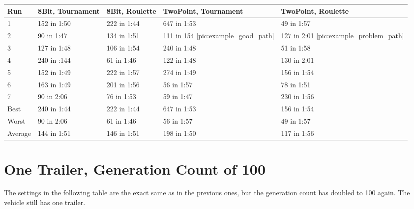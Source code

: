 \begin{center}
	\begin{tabular}{| l | l | l | p{3cm} | p{3cm}|}
		\hline
		Run 		& 8Bit, Tournament 	& 8Bit, Roulette 	& TwoPoint, Tournament 	& TwoPoint, Roulette	\\ \hline
		1				&	152 in 1:50				&	222 in 1:44			&	647 in 1:53						&	49 in 1:57					\\ \hline
		2				&	90 in 1:47				&	134 in 1:51			& 111 in 154 \ref{pic:example_good_path}			&	127 in 2:01 \ref{pic:example_problem_path}	\\ \hline		
		3				&	127 in 1:48				&	106 in 1:54			& 240 in 1:48						& 51 in 1:58					\\ \hline
		4				&	240 in :144				&	61 in 1:46			& 122 in 1:48						& 130 in 2:01					\\ \hline
		5				&	152 in 1:49				&	222 in 1:57			&	274 in 1:49						&	156 in 1:54					\\ \hline
		6				&	163 in 1:49				& 201 in 1:56			&	56 in 1:57						& 78 in 1:51					\\ \hline
		7				&	90 in 2:06				&	76 in 1:53			& 59 in 1:47						& 230 in 1:56					\\ \hline
		Best		&	240 in 1:44				&	222 in 1:44			&	647 in 1:53						&	156 in 1:54					\\ \hline
		Worst		&	90 in 2:06				&	61 in 1:46			&	56 in 1:57						& 49 in 1:57					\\ \hline
		Average	&	144 in 1:51				& 146 in 1:51			& 198 in 1:50						&	117 in 1:56					\\ \hline
		\hline
	\end{tabular}
\end{center}

\section{One Trailer, Generation Count of 100}
\label{sec:no_trailer_100}

The settings in the following table are the exact same as in the previous ones, but the generation count has doubled to 100 again. The vehicle still has one trailer.

